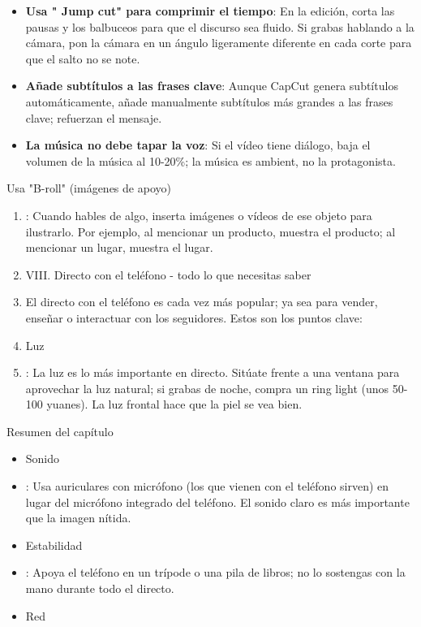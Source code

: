 
\begin{itemize}
  \item \textbf{Usa " Jump cut" para comprimir el tiempo}: En la edición, corta las pausas y los balbuceos para que el discurso sea fluido. Si grabas hablando a la cámara, pon la cámara en un ángulo ligeramente diferente en cada corte para que el salto no se note.
  \item \textbf{Añade subtítulos a las frases clave}: Aunque CapCut genera subtítulos automáticamente, añade manualmente subtítulos más grandes a las frases clave; refuerzan el mensaje.
  \item \textbf{La música no debe tapar la voz}: Si el vídeo tiene diálogo, baja el volumen de la música al 10-20\%; la música es ambient, no la protagonista.
\end{itemize}

\begin{tcbpractice}{Usa "B-roll" (imágenes de apoyo)}
\begin{enumerate}
  \item : Cuando hables de algo, inserta imágenes o vídeos de ese objeto para ilustrarlo. Por ejemplo, al mencionar un producto, muestra el producto; al mencionar un lugar, muestra el lugar.
  \item VIII. Directo con el teléfono - todo lo que necesitas saber
  \item El directo con el teléfono es cada vez más popular; ya sea para vender, enseñar o interactuar con los seguidores. Estos son los puntos clave:
  \item Luz
  \item : La luz es lo más importante en directo. Sitúate frente a una ventana para aprovechar la luz natural; si grabas de noche, compra un ring light (unos 50-100 yuanes). La luz frontal hace que la piel se vea bien.
\end{enumerate}

\end{tcbpractice}

\begin{tcbsummary}{Resumen del capítulo}
\begin{itemize}
  \item Sonido
  \item : Usa auriculares con micrófono (los que vienen con el teléfono sirven) en lugar del micrófono integrado del teléfono. El sonido claro es más importante que la imagen nítida.
  \item Estabilidad
  \item : Apoya el teléfono en un trípode o una pila de libros; no lo sostengas con la mano durante todo el directo.
  \item Red
\end{itemize}

\end{tcbsummary}
